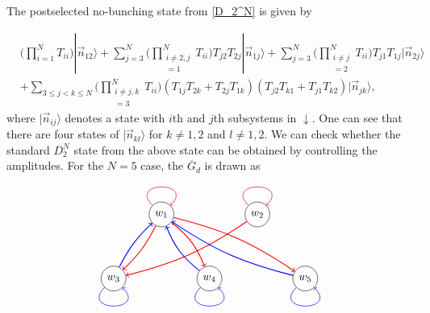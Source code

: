 \documentclass[a4paper,twocolumn,8pt,accepted=2021-12-15]{quantumarticle}
\newcommand{\nn}{\nonumber}
\def\>{\rangle}
\def\vn{{\vec{n}}}
\def\dc{{\overline{G}_d }}
\begin{document}
	The postselected no-bunching state from \eqref{D_2^N} is given by
	\begin{widetext}
		\begin{align}
			&\big(\prod_{i=1}^{N}T_{ii}\big)|\vn_{12}\> + \sum_{j=3}^{N}\big(\prod_{\substack{i\neq 2,j\\ =1} }^{N}T_{ii}\big)T_{j2}T_{2j}|\vn_{1j}\> + \sum_{j=3}^{N}\big(\prod_{\substack{i\neq j\\=2}}^{N}T_{ii}\big)T_{j1}T_{1j}|\vn_{2j}\>  \nn \\
			&+ \sum_{3\le j< k\le N}	\big( \prod_{\substack{i\neq j,k\\ =3}}^{N}T_{ii}\big)(T_{1j}T_{2k}+T_{2j}T_{1k})(T_{j2}T_{k1}+T_{j1}T_{k2})|\vn_{jk}\>,
		\end{align}
		where $|\vec{n}_{ij}\>$ denotes a state with $i$th and $j$th subsystems in $\downarrow$.
		One can see that there are four states of $|\vec{n}_{kl}\>$ for $k\neq 1,2$ and $l\neq 1,2$.
		We can check whether the standard $D_2^N$ state from the above state can be obtained by controlling the amplitudes.
		For the $N=5$ case, the $\dc$ is drawn as
		\[\begin{tikzpicture}
			\node[circle,draw] (c) at (-3,0) {$w_3$};
			\node[circle,draw] (d) at (0,0) {$w_4$};		
			\node[circle,draw] (e) at (3,0) {$w_{5}$};
			\node[circle,draw] (a) at (-1.5,2) {$w_{1}$};
			\node[circle,draw] (b) at (1.5,2) {$w_{2}$};
			\path[every loop/.style={min distance=10mm,in=45,out=135,looseness=5,color=red ,->},line width = 0.5pt] (a) edge [loop above]   (a);
			\path[every loop/.style={min distance=10mm,in=45,out=135,looseness=5,color=red ,->},line width = 0.5pt] (b) edge [loop above]   (b);
			\path[every loop/.style={min distance=10mm,in=-45,out=-135,looseness=5,color=blue ,->},line width = 0.5pt] (c) edge [loop above]  (c);
			\path[every loop/.style={min distance=10mm,in=-45,out=-135,looseness=5,color=blue ,->},line width = 0.5pt] (d) edge [loop above] (d);
			\path[every loop/.style={min distance=10mm,in=-45,out=-135,looseness=5,color=blue ,->},line width = 0.5pt] (e) edge [loop above]   (e);			
			\path[line width = 0.8pt,->,color=red] (a) edge [bend left=10] (c);		
			\path[line width = 0.8pt,->,color=red] (a) edge [bend left=15] (d);
			\path[line width = 0.8pt,->,color=red] (a) edge [bend left=10] (e);				
			\path[line width = 0.8pt,->,color=blue ] (c) edge [bend left=10] (a);	
			\path[line width = 0.8pt,->,color=blue ] (d) edge [bend left=15] (a);	
			\path[line width = 0.8pt,->,color=blue ] (e) edge [bend left=10] (a);
			\path[line width = 0.8pt,->,color=red] (b) edge [bend left=10] (c);		

\end{tikzpicture}\]
\end{widetext}
\end{document}
